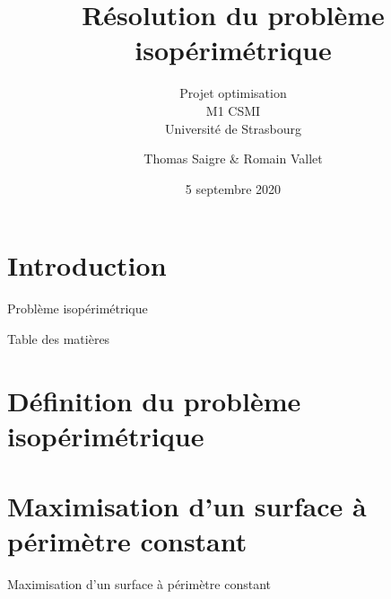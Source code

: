 \documentclass[11pt,envcountsect,aspectratio=169]{beamer} %
\author[Thomas S. \& Romain V.]{Thomas Saigre \& Romain Vallet}
\title{Résolution du problème isopérimétrique}
\subtitle{Projet optimisation \\ M1 CSMI \\ Université de Strasbourg}
\date{5 septembre 2020}  %
\newcommand{\frametitre}{\begin{frame}
	\begin{center}
	{\Large\bf \secname}
	\end{center}
	\end{frame}
}
\newcommand\thm[2]{%
	\begin{beamerboxesrounded}[upper=titreB,lower=texteB,shadow=true]{Théorème : #1}
		\it #2
	\end{beamerboxesrounded}
	\normalfont
}
\begin{document}
\begin{frame}[plain]
\titlepage
\end{frame}


\section[Introduction]{Introduction}





\begin{frame}{Problème isopérimétrique}

\end{frame}





\begin{frame}{Table des matières}
\tableofcontents[hideallsubsections]
\end{frame}




\section{Définition du problème isopérimétrique}




\section{Maximisation d'un surface à périmètre constant}
%


\begin{frame}{Maximisation d'un surface à périmètre constant}



\end{frame}
\end{document}
